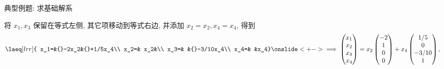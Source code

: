 \begin{frame}{典型例题: 求基础解系}
	\onslide<+->
	\begin{solution}[续解]
		将 $x_1,x_3$ 保留在等式左侧, 其它项移动到等式右边, 并添加 $x_2=x_2,x_4=x_4$, 得到
		\[\laeq[lrr]{
			x_1=&{}-2x_2&{}+1/5x_4\\
			x_2=&  x_2&\\
			x_3=&     &{}-3/10x_4\\
			x_4=&     &x_4}
		\onslide<+->{\implies\begin{pmatrix}
			x_1\\x_2\\x_3\\x_4
		\end{pmatrix}=x_2\begin{pmatrix}
			-2\\1\\0\\0
		\end{pmatrix}+x_4\begin{pmatrix}
			1/5\\0\\-3/10\\1
		\end{pmatrix},}\]
		\onslide<+->{%
			通解为
			\[\begin{pmatrix}
				x_1\\x_2\\x_3\\x_4
			\end{pmatrix}=k_1\begin{pmatrix}
				-2\\1\\0\\0
			\end{pmatrix}+k_2\begin{pmatrix}
				1/5\\0\\-3/10\\1
			\end{pmatrix},\quad k_1,k_2\text{为任意常数}.\]
		}
	\end{solution}
\end{frame}


